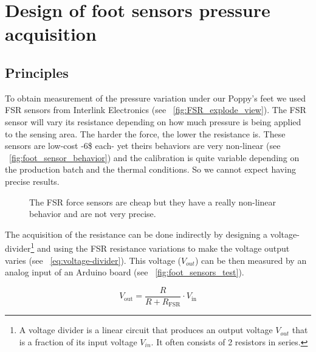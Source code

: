 
\chapter{Design of foot sensors pressure acquisition} %
\label{appendix:design_FSR}


\section{Principles} %
To obtain measurement of the pressure variation under our Poppy's feet we used FSR sensors from Interlink Electronics (see \figurename~\ref{fig:FSR_explode_view}). The FSR sensor will vary its resistance depending on how much pressure is being applied to the sensing area. The harder the force, the lower the resistance is. These sensors are low-cost -6\$ each- yet theirs behaviors are very non-linear (see \figurename~\ref{fig:foot_sensor_behavior}) and the calibration is quite variable depending on the production batch and the thermal conditions. So we cannot expect having precise results.

\begin{figure}[ht]
\centering
    \hfil
    \caption{The FSR force sensors are cheap but they have a really non-linear behavior and are not very precise.}

\end{figure}

The acquisition of the resistance can be done indirectly by designing a voltage-divider\footnote{A voltage divider is a linear circuit that produces an output voltage $V_{out}$ that is a fraction of its input voltage $V_{in}$. It often consists of 2 resistors in series.} and using the FSR resistance variations to make the voltage output varies (see \equationname~\ref{eq:voltage-divider}). This voltage ($V_{out}$) can be then measured by an analog input of an Arduino board (see \figurename~\ref{fig:foot_sensors_test}).

\begin{equation}
    V_\mathrm{out} = \frac{R}{R+R_\mathrm{FSR}} \cdot V_\mathrm{in}
\label{eq:voltage-divider}
\end{equation}


